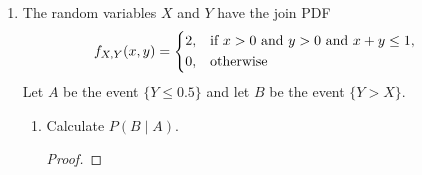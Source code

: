 \documentclass[paper=usletter, fontsize=12pt]{article}
\begin{document}
\begin{enumerate}
\begin{enumerate}
\begin{proof}
            \end{proof}

            \item On a given day your driving time was 45 minutes. What is the
            probability that this particular day was rainy?
            \begin{proof}

                \begin{align*}
                    P(\text{rainy} \mid X=45) & = \frac{P(\text{rainy})f(X=45 \mid \text{rainy})}{f(X=45)}\\
                    & = \frac{\frac{1}{3}\cdot\frac{1}{20}}{\frac{2}{45}+\frac{1}{60}} \\
                    & = \frac{3}{11} \qedhere
                \end{align*}

            \end{proof}

            \item Your distance to work is 20 miles. What is the PDF, the mean,
            and the variance of your average speed (driving distance over
            driving time)?
            \begin{proof}



            \end{proof}

        \end{enumerate}

        \item The random variables $X$ and $Y$ have the join PDF
        \begin{align*}
            f_{X,Y}(x,y) & =
            \begin{dcases}
                2, & \text{if $x > 0$ and $y>0$ and $x+y\le 1$},\\
                0, & \text{otherwise}
            \end{dcases}
        \end{align*}
        Let $A$ be the event $\{Y \le 0.5\}$ and let $B$ be the event
        $\{Y>X\}$.
        \begin{enumerate}

            \item Calculate $P(B \mid A)$.
            \begin{proof}


\end{proof}
\end{enumerate}
\end{enumerate}
\end{document}
